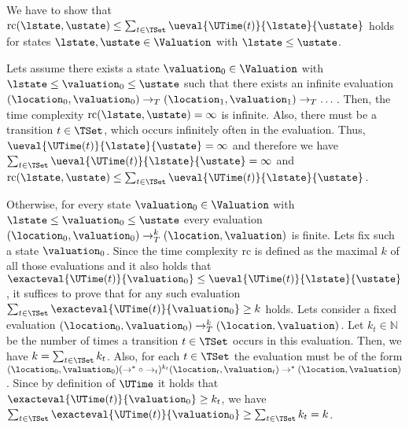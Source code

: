 We have to show that $\text{rc}(\lstate, \ustate) \leq \sum_{t \in \TSet} \ueval{\UTime(t)}{\lstate}{\ustate}$ holds for states $\lstate, \ustate \in \Valuation$ with $\lstate \leq \ustate$.

Lets assume there exists a state $\valuation_0 \in \Valuation$ with $\lstate \leq \valuation_0 \leq \ustate$ such that there exists an infinite evaluation $(\location_0, \valuation_0) \rightarrow_T (\location_1, \valuation_1) \rightarrow_T \dots$.
Then, the time complexity $\text{rc}(\lstate, \ustate) = \infty$ is infinite.
Also, there must be a transition $t \in \TSet$, which occurs infinitely often in the evaluation.
Thus, $\ueval{\UTime(t)}{\lstate}{\ustate} = \infty$ and therefore we have $\sum_{t \in \TSet} \ueval{\UTime(t)}{\lstate}{\ustate} = \infty$ and $\text{rc}(\lstate, \ustate) \leq \sum_{t \in \TSet} \ueval{\UTime(t)}{\lstate}{\ustate}$.

Otherwise, for every state $\valuation_0 \in \Valuation$ with $\lstate \leq \valuation_0 \leq \ustate$ every evaluation $(\location_0, \valuation_0) \rightarrow^k_T (\location, \valuation)$ is finite.
Lets fix such a state $\valuation_0$.
Since the time complexity $\text{rc}$ is defined as the maximal $k$ of all those evaluations and it also holds that $\exacteval{\UTime(t)}{\valuation_0} \leq \ueval{\UTime(t)}{\lstate}{\ustate}$, it suffices to prove that for any such evaluation $\sum_{t \in \TSet} \exacteval{\UTime(t)}{\valuation_0} \geq k$ holds.
Lets consider a fixed evaluation $(\location_0, \valuation_0) \rightarrow^k_T (\location, \valuation)$.
Let $k_t \in \mathbb{N}$ be the number of times a transition $t \in \TSet$ occurs in this evaluation.
Then, we have $k = \sum_{t \in \TSet} k_t$.
Also, for each $t \in \TSet$ the evaluation must be of the form $(\location_0, \valuation_0) (\rightarrow^* \circ \rightarrow_t)^{k_t} (\location_t, \valuation_t) \rightarrow^* (\location, \valuation)$.
Since by definition of $\UTime$ it holds that $\exacteval{\UTime(t)}{\valuation_0} \geq k_t$, we have $\sum_{t \in \TSet} \exacteval{\UTime(t)}{\valuation_0} \geq \sum_{t \in \TSet} k_t = k$.
